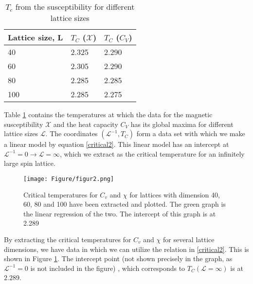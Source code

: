 \begin{table}[H]
\centering
\caption{$T_c$ from the susceptibility for different lattice sizes}
\begin{tabular}{l|l|l}
\hline
Lattice size, L & $T_C$ ($\mathcal{X}$) & $T_C$ ($C_V$)\\
\hline
40 & 2.325 & 2.290\\
60 & 2.305 & 2.290\\
80 & 2.285 & 2.285\\
100 & 2.285 & 2.275\\
\end{tabular}
\label{tab:Tc_susc}
\end{table}
Table \ref{tab:Tc_susc} contains the temperatures at which the data for the magnetic susceptibility $\mathcal{X}$ and the heat capacity $C_V$ has its global maxima for different lattice sizes $\mathcal{L}$. The coordinates $(\mathcal{L}^{-1}, T_C)$ form a data set with which we make a linear model by equation \ref{critical2}. This linear model has an intercept at $\mathcal{L}^{-1} = 0 \to \mathcal{L} = \infty$, which we extract as the critical temperature for an infinitely large spin lattice. 

\begin{figure}[H]
    \centering
    \texttt{[image: Figure/figur2.png]}
    \caption{Critical temperatures for $C_v$ and $\chi$ for lattices with dimension 40, 60, 80 and 100 have been extracted and plotted. The green graph is the linear regression of the two. The intercept of this graph is at 2.289}
    \label{fig:tcritical}
\end{figure}

By extracting the critical temperatures for $C_v$ and $\chi$ for several lattice dimensions, we have data in which we can utilize the relation in \eqref{critical2}. This is shown in Figure \ref{fig:tcritical}. The intercept point (not shown precisely in the graph, as $\mathcal{L}^{-1} = 0$ is not included in the figure) , which corresponds to $T_C(\mathcal{L}=\infty)$ is at $2.289$.